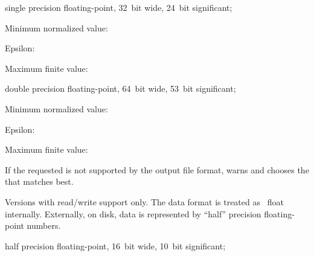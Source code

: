 \begin{codelist}
  \begin{description}
  \item[\code{r32}]\itemend
     single precision floating-point, 32~bit wide, 24~bit significant;

    \begin{compactitemize}
    \item
      Minimum normalized value: 
    \item
      Epsilon: 
    \item
      Maximum finite value: 
    \end{compactitemize}

  \item[\code{r64}]\itemend
     double precision floating-point, 64~bit wide, 53~bit significant;

    \begin{compactitemize}
    \item
      Minimum normalized value: 
    \item
      Epsilon: 
    \item
      Maximum finite value: 
    \end{compactitemize}
  \end{description}

  If the requested  is not supported by the output file format, \App{} warns and
  chooses the  that matches best.

  \begin{restrictedmaterial}{Versions with  read\slash write support only.}
    \noindent The  data format is treated as ~float
    internally.  Externally, on disk,  data is represented by ``half''
    precision floating-point numbers.

     half precision floating-point, 16~bit wide,
    10~bit significant;


\end{restrictedmaterial}
\end{codelist}
